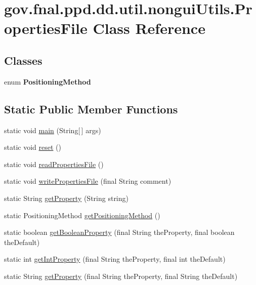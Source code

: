 \hypertarget{classgov_1_1fnal_1_1ppd_1_1dd_1_1util_1_1nonguiUtils_1_1PropertiesFile}{\section{gov.\-fnal.\-ppd.\-dd.\-util.\-nongui\-Utils.\-Properties\-File Class Reference}
\label{classgov_1_1fnal_1_1ppd_1_1dd_1_1util_1_1nonguiUtils_1_1PropertiesFile}
}
\subsection*{Classes}
\begin{DoxyCompactItemize}
\item 
enum {\bfseries Positioning\-Method}
\end{DoxyCompactItemize}
\subsection*{Static Public Member Functions}
\begin{DoxyCompactItemize}
\item 
static void \hyperlink{classgov_1_1fnal_1_1ppd_1_1dd_1_1util_1_1nonguiUtils_1_1PropertiesFile_a2a63d201aea361aeaa8c6a661212d38f}{main} (String\mbox{[}$\,$\mbox{]} args)
\item 
static void \hyperlink{classgov_1_1fnal_1_1ppd_1_1dd_1_1util_1_1nonguiUtils_1_1PropertiesFile_aa4808ef580cbf59dbb145b2eca31fd08}{reset} ()
\item 
static void \hyperlink{classgov_1_1fnal_1_1ppd_1_1dd_1_1util_1_1nonguiUtils_1_1PropertiesFile_a41f058e2cc7f432f293795decbd910a1}{read\-Properties\-File} ()
\item 
static void \hyperlink{classgov_1_1fnal_1_1ppd_1_1dd_1_1util_1_1nonguiUtils_1_1PropertiesFile_ac7322098b9553f60448f3286a44c68e1}{write\-Properties\-File} (final String comment)
\item 
static String \hyperlink{classgov_1_1fnal_1_1ppd_1_1dd_1_1util_1_1nonguiUtils_1_1PropertiesFile_ad3e5ac77723df18cb845643e3e219f49}{get\-Property} (String string)
\item 
static Positioning\-Method \hyperlink{classgov_1_1fnal_1_1ppd_1_1dd_1_1util_1_1nonguiUtils_1_1PropertiesFile_ac40ab7846140bf28b00bb3a3427bb675}{get\-Positioning\-Method} ()
\item 
static boolean \hyperlink{classgov_1_1fnal_1_1ppd_1_1dd_1_1util_1_1nonguiUtils_1_1PropertiesFile_a90e03a48aea04fa11243c8aecac470e3}{get\-Boolean\-Property} (final String the\-Property, final boolean the\-Default)
\item 
static int \hyperlink{classgov_1_1fnal_1_1ppd_1_1dd_1_1util_1_1nonguiUtils_1_1PropertiesFile_a5ed1fc6f67450475cdff0256ca4d6aad}{get\-Int\-Property} (final String the\-Property, final int the\-Default)
\item 
static String \hyperlink{classgov_1_1fnal_1_1ppd_1_1dd_1_1util_1_1nonguiUtils_1_1PropertiesFile_a1a69f3f3cadbe2d83c6aa753809b6717}{get\-Property} (final String the\-Property, final String the\-Default)
\end{DoxyCompactItemize}


